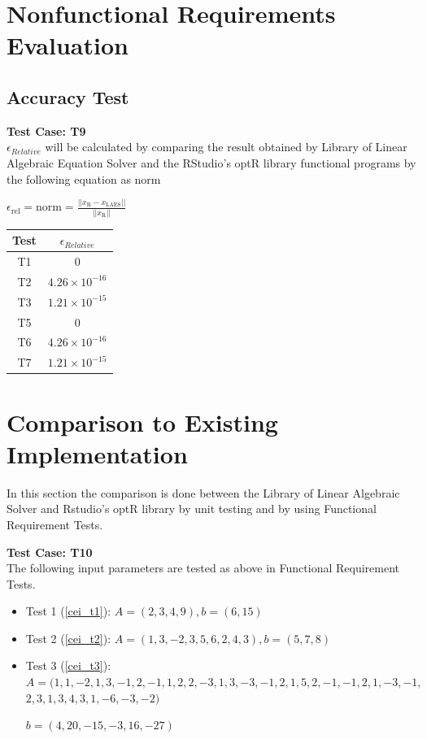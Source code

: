 \documentclass[12pt, titlepage]{article}
\begin{document}
\section{Nonfunctional Requirements Evaluation}\label{sec_nfre}
\subsection{Accuracy Test}

\textbf{Test Case: T9}\\

$\epsilon_{Relative}$ will be calculated by comparing the result
obtained by Library of Linear Algebraic Equation Solver and the RStudio's optR library
functional programs by the following equation as norm

\begin{center}
 $\epsilon_\text{rel} = \text{norm} = \frac{||x_\text{R} - x_\text{LAES}||}{||x_\text{R}||}$
\end{center}

\begin{center}
\begin{tabular}{||c c||}
\hline
Test & $\epsilon_{Relative}$ \\[0.5ex]
\hline\hline
T1 & $0$\\
\hline
T2 & $4.26 \times 10^{-16}$\\
\hline
T3 & $1.21 \times 10^{-15}$\\
\hline
T5 & $0$\\
\hline
T6 & $4.26 \times 10^{-16}$\\
\hline
T7 & $1.21 \times 10^{-15}$\\
\hline

\end{tabular}
\end{center}

	
\section{Comparison to Existing Implementation}	\label{sec_cei}

In this section the comparison is done between the Library of Linear Algebraic Solver and Rstudio's optR library by unit testing and by using Functional Requirement Tests. 

\textbf{Test Case: T10}\\

The following input parameters are tested as above in Functional Requirement Tests.

\begin{itemize}
\item Test 1 (\ref{cei_t1}): $A = (2, 3, 4, 9), b = (6, 15)$
\item Test 2 (\ref{cei_t2}): $A = (1, 3, -2, 3, 5, 6, 2, 4, 3), b = (5, 7, 8)$
\item Test 3 (\ref{cei_t3}): $A = (1, 1, -2, 1, 3, -1, 2, -1, 1, 2, 2, -3, 1, 3, -3, -1, 2, 1,
5, 2, -1, -1, 2, 1, -3, -1, $
$2, 3, 1, 3, 4, 3, 1, -6, -3, -2)$

$b = (4, 20, -15, -3, 16, -27)$
\end{itemize}
\end{document}

